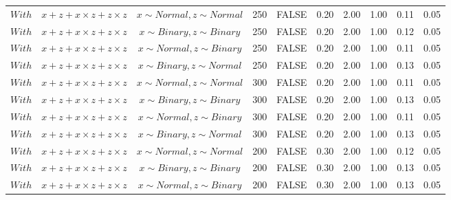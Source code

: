 \begin{longtable}{lccccccccc}
  $With$ & $\textit{x} + \textit{z} + \textit{x} \times \textit{z} + \textit{z} \times \textit{z}$ & $\textit{x} \sim Normal , \textit{z} \sim Normal$ & 250 & FALSE & 0.20 & 2.00 & 1.00 & 0.11 & 0.05 \\ 
  $With$ & $\textit{x} + \textit{z} + \textit{x} \times \textit{z} + \textit{z} \times \textit{z}$ & $\textit{x} \sim Binary, \textit{z} \sim Binary$ & 250 & FALSE & 0.20 & 2.00 & 1.00 & 0.12 & 0.05 \\ 
  $With$ & $\textit{x} + \textit{z} + \textit{x} \times \textit{z} + \textit{z} \times \textit{z}$ & $\textit{x} \sim Normal, \textit{z} \sim Binary$ & 250 & FALSE & 0.20 & 2.00 & 1.00 & 0.11 & 0.05 \\ 
  $With$ & $\textit{x} + \textit{z} + \textit{x} \times \textit{z} + \textit{z} \times \textit{z}$ & $\textit{x} \sim Binary, \textit{z} \sim Normal$ & 250 & FALSE & 0.20 & 2.00 & 1.00 & 0.13 & 0.05 \\ 
  $With$ & $\textit{x} + \textit{z} + \textit{x} \times \textit{z} + \textit{z} \times \textit{z}$ & $\textit{x} \sim Normal , \textit{z} \sim Normal$ & 300 & FALSE & 0.20 & 2.00 & 1.00 & 0.11 & 0.05 \\ 
  $With$ & $\textit{x} + \textit{z} + \textit{x} \times \textit{z} + \textit{z} \times \textit{z}$ & $\textit{x} \sim Binary, \textit{z} \sim Binary$ & 300 & FALSE & 0.20 & 2.00 & 1.00 & 0.13 & 0.05 \\ 
  $With$ & $\textit{x} + \textit{z} + \textit{x} \times \textit{z} + \textit{z} \times \textit{z}$ & $\textit{x} \sim Normal, \textit{z} \sim Binary$ & 300 & FALSE & 0.20 & 2.00 & 1.00 & 0.11 & 0.05 \\ 
  $With$ & $\textit{x} + \textit{z} + \textit{x} \times \textit{z} + \textit{z} \times \textit{z}$ & $\textit{x} \sim Binary, \textit{z} \sim Normal$ & 300 & FALSE & 0.20 & 2.00 & 1.00 & 0.13 & 0.05 \\ 
  $With$ & $\textit{x} + \textit{z} + \textit{x} \times \textit{z} + \textit{z} \times \textit{z}$ & $\textit{x} \sim Normal , \textit{z} \sim Normal$ & 200 & FALSE & 0.30 & 2.00 & 1.00 & 0.12 & 0.05 \\ 
  $With$ & $\textit{x} + \textit{z} + \textit{x} \times \textit{z} + \textit{z} \times \textit{z}$ & $\textit{x} \sim Binary, \textit{z} \sim Binary$ & 200 & FALSE & 0.30 & 2.00 & 1.00 & 0.13 & 0.05 \\ 
  $With$ & $\textit{x} + \textit{z} + \textit{x} \times \textit{z} + \textit{z} \times \textit{z}$ & $\textit{x} \sim Normal, \textit{z} \sim Binary$ & 200 & FALSE & 0.30 & 2.00 & 1.00 & 0.13 & 0.05 \\ 

\end{longtable}
